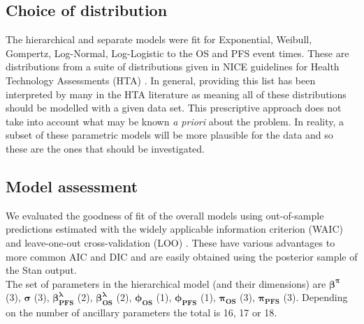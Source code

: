 \documentclass[AMA,STIX1COL]{WileyNJD-v2}
\begin{document}
%
\subsection{Choice of distribution}
The hierarchical and separate models were fit for Exponential, Weibull, Gompertz, Log-Normal, Log-Logistic to the OS and PFS event times.
These are distributions from a suite of distributions given in NICE guidelines for Health Technology Assessments (HTA) \cite{Latimer2011}.
In general, providing this list has been interpreted by many in the HTA literature as meaning all of these distributions should be modelled with a given data set.
This prescriptive approach does not take into account what may be known {\it a priori} about the problem.
In reality, a subset of these parametric models will be more plausible for the data and so these are the ones that should be investigated.

%
\subsection{Model assessment}
We evaluated the goodness of fit of the overall models using out-of-sample predictions estimated with the widely applicable information criterion (WAIC) and leave-one-out cross-validation (LOO) \cite{Vehtari2017}.
These have various advantages to more common AIC and DIC and are easily obtained using the posterior sample of the Stan output.\\
The set of parameters in the hierarchical model (and their dimensions) are
$\mathbf{\beta^{\pi}}$ (3), $\mathbf{\sigma}$ (3), $\mathbf{\beta^{\lambda}_{PFS}}$ (2), $\mathbf{\beta^{\lambda}_{OS}}$ (2), $\mathbf{\phi_{OS}}$ (1), $\mathbf{\phi_{PFS}}$ (1), $\mathbf{\pi_{OS}}$ (3), $\mathbf{\pi_{PFS}}$ (3).
Depending on the number of ancillary parameters the total is 16, 17 or 18.


\end{document}

